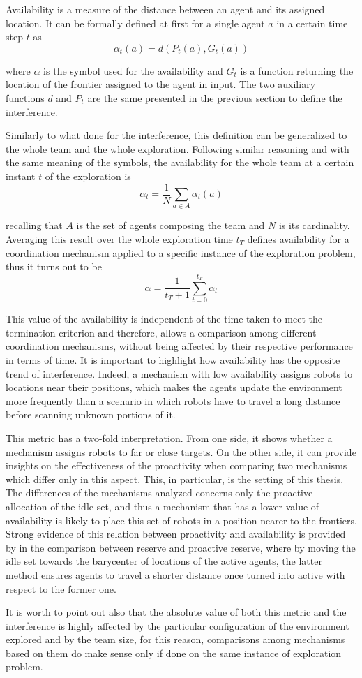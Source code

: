 Availability is a measure of the distance between an agent and its
assigned location. It can be formally defined at first for a single
agent $a$ in a certain time step $t$ as 
\[
\alpha_{t}\left(a\right)=d\left(P_{t}\left(a\right),G_{t}\left(a\right)\right)
\]

where $\alpha$ is the symbol used for the availability and $G_{t}$
is a function returning the location of the frontier assigned to the
agent in input. The two auxiliary functions $d$ and $P_{t}$ are
the same presented in the previous section to define the interference. 

Similarly to what done for the interference, this definition can be
generalized to the whole team and the whole exploration. Following
similar reasoning and with the same meaning of the symbols, the availability
for the whole team at a certain instant $t$ of the exploration is
\[
\alpha_{t}=\frac{1}{N}\sum_{a\in A}\alpha_{t}\left(a\right)
\]

recalling that $A$ is the set of agents composing the team and $N$
is its cardinality. Averaging this result over the whole exploration
time $t_{T}$ defines availability for a coordination mechanism applied
to a specific instance of the exploration problem, thus it turns out
to be 
\[
\alpha=\frac{1}{t_{T}+1}\sum_{t=0}^{t_{T}}\alpha_{t}
\]

This value of the availability is independent of the time taken to
meet the termination criterion and therefore, allows a comparison
among different coordination mechanisms, without being affected by
their respective performance in terms of time. It is important to
highlight how availability has the opposite trend of interference.
Indeed, a mechanism with low availability assigns robots to locations
near their positions, which makes the agents update the environment
more frequently than a scenario in which robots have to travel a long
distance before scanning unknown portions of it. 

This metric has a two-fold interpretation. From one side, it shows
whether a mechanism assigns robots to far or close targets. On the
other side, it can provide insights on the effectiveness of the proactivity
when comparing two mechanisms which differ only in this aspect. This,
in particular, is the setting of this thesis. The differences of the
mechanisms analyzed concerns only the proactive allocation of the
idle set, and thus a mechanism that has a lower value of availability
is likely to place this set of robots in a position nearer to the
frontiers. Strong evidence of this relation between proactivity and
availability is provided by \cite{Cattaneo2017} in the comparison between
reserve and proactive reserve, where by moving the idle set towards
the barycenter of locations of the active agents, the latter method
ensures agents to travel a shorter distance once turned into active
with respect to the former one.

It is worth to point out also that the absolute value of both this
metric and the interference is highly affected by the particular configuration
of the environment explored and by the team size, for this reason,
comparisons among mechanisms based on them do make sense only if done
on the same instance of exploration problem. 


